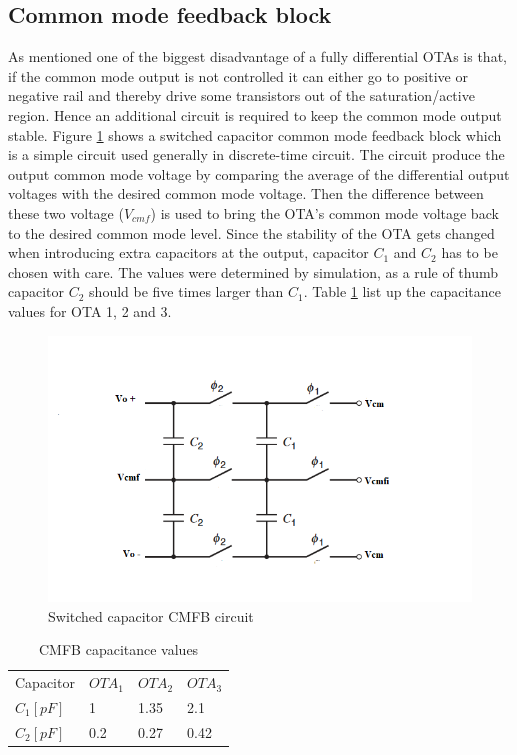 \subsection{Common mode feedback block}
As mentioned one of the biggest disadvantage of a fully differential OTAs is that, if the common mode output is not controlled it can either go to positive or negative rail and thereby drive some transistors out of the saturation/active region. Hence an additional circuit is required to keep the common mode output stable. Figure \ref{cmfb} shows a switched capacitor common mode feedback block which is a simple circuit used generally in discrete-time circuit. The circuit produce the output common mode voltage by comparing the average of the differential output voltages with the desired common mode voltage. Then the difference between these two voltage ($V_{cmf}$) is used to bring the OTA's common mode voltage back to the desired common mode level. Since the stability of the OTA gets changed when introducing extra capacitors at the output, capacitor $C_1$ and $C_2$ has to be chosen with care. The values were determined by simulation, as a rule of thumb capacitor $C_2$ should be five times larger than $C_1$\cite{Johns}. Table \ref{final_cmfb} list up the capacitance values for OTA 1, 2 and 3. 
\begin{figure}[h!]
\centering
\includegraphics[scale = 0.7]{images/cmf_circuit.png}
\caption{Switched capacitor CMFB circuit\cite{Grey}}
\label{cmfb}
\end{figure}

\begin{table}[h!]
\centering
\caption{CMFB capacitance values}
\label{final_cmfb}
\begin{tabular}{l|l|l|l}
\hline
\multirow{1}{*}{Capacitor} & \multicolumn{1}{c|}{$OTA_1$} & \multicolumn{1}{c|}{$OTA_2$} & \multicolumn{1}{c}{$OTA_3$}\\\cline{1-4}
                       
            $C_1[pF]$       & 1 & 1.35 & 2.1\\
            $C_2 [pF]$      & 0.2 & 0.27 & 0.42 \\
            
\hline            
\end{tabular}
\end{table}

